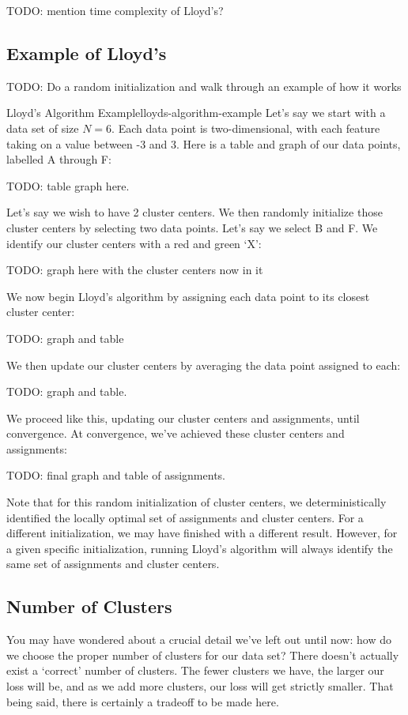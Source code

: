 TODO: mention time complexity of Lloyd's?

\subsection{Example of Lloyd's}
TODO: Do a random initialization and walk through an example of how it works

\begin{example}{Lloyd's Algorithm Example}{lloyds-algorithm-example}
	Let's say we start with a data set of size $N=6$. Each data point is two-dimensional, with each feature taking on a value between -3 and 3. Here is a table and graph of our data points, labelled A through F:

	TODO: table graph here.

	Let's say we wish to have 2 cluster centers. We then randomly initialize those cluster centers by selecting two data points. Let's say we select B and F. We identify our cluster centers with a red and green `X':

	TODO: graph here with the cluster centers now in it

	We now begin Lloyd's algorithm by assigning each data point to its closest cluster center:

	TODO: graph and table

	We then update our cluster centers by averaging the data point assigned to each:

	TODO: graph and table.

	We proceed like this, updating our cluster centers and assignments, until convergence. At convergence, we've achieved these cluster centers and assignments:

	TODO: final graph and table of assignments.

	Note that for this random initialization of cluster centers, we deterministically identified the locally optimal set of assignments and cluster centers. For a different initialization, we may have finished with a different result. However, for a given specific initialization, running Lloyd's algorithm will always identify the same set of assignments and cluster centers.
\end{example}

\subsection{Number of Clusters}
You may have wondered about a crucial detail we've left out until now: how do we choose the proper number of clusters for our data set? There doesn't actually exist a `correct' number of clusters. The fewer clusters we have, the larger our loss will be, and as we add more clusters, our loss will get strictly smaller. That being said, there is certainly a tradeoff to be made here.

